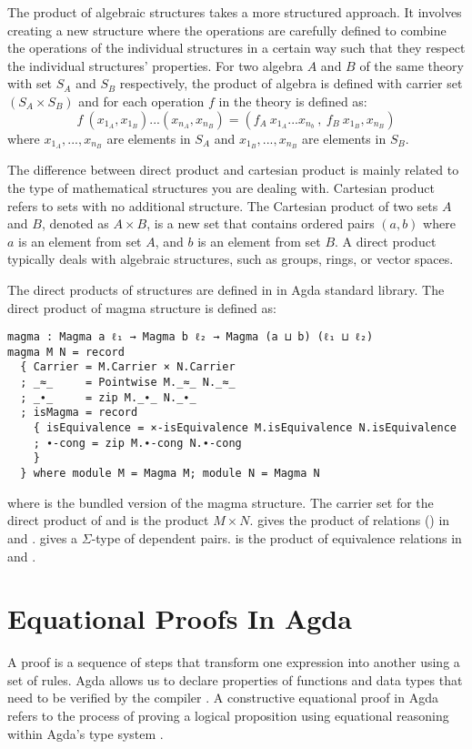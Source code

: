 The product of algebraic structures takes a more structured approach. It
involves creating a new structure where the operations are carefully defined to
combine the operations of the individual structures in a certain way such that
they respect the individual structures' properties. For two algebra $A$ and $B$
of the same theory with set $S_A$ and $S_B$ respectively, the product of algebra
is defined with carrier set $(S_A \times S_B)$ and for each operation $f$ in the
theory is defined as:
\[f\ (x_{1_A},x_{1_B})...(x_{n_A},x_{n_B}) = (f_A\ x_{1_A}...x_{n_b}\ ,\ f_B\
x_{1_B},x_{n_B} )\] where $x_{1_A},...,x_{n_B}$ are elements in $S_A$ and
$x_{1_B},...,x_{n_B}$ are elements in $S_B$. 

The difference between direct product and cartesian product is mainly related
to the type of mathematical structures you are dealing with. Cartesian product
refers to sets with no additional structure. The Cartesian product of two sets $A$
and $B$, denoted as $A × B$, is a new set that contains ordered pairs $(a, b)$ where
$a$ is an element from set $A$, and $b$ is an element from set $B$. A direct product
typically deals with algebraic structures, such as groups, rings, or vector
spaces.

The direct products of structures are defined in
 in Agda standard library. The direct
product of magma structure is defined as:

\begin{verbatim}
magma : Magma a ℓ₁ → Magma b ℓ₂ → Magma (a ⊔ b) (ℓ₁ ⊔ ℓ₂)
magma M N = record
  { Carrier = M.Carrier × N.Carrier
  ; _≈_     = Pointwise M._≈_ N._≈_
  ; _∙_     = zip M._∙_ N._∙_
  ; isMagma = record
    { isEquivalence = ×-isEquivalence M.isEquivalence N.isEquivalence
    ; ∙-cong = zip M.∙-cong N.∙-cong
    }
  } where module M = Magma M; module N = Magma N
\end{verbatim}

where  is the bundled version of the magma structure. The carrier
set for the direct product of  and  is the product $M \times N$.
\inline{Pointwise} gives the product of relations (\inline{_≈_}) in 
and \inline{N}. \inline{zip} gives a $\Sigma$-type of dependent pairs.
\inline{×-isEquivalence} is the product of equivalence relations in \inline{M}
and \inline{N}.

\section{Equational Proofs In Agda}
A proof is a sequence of steps that transform one expression into another using
a set of rules. Agda allows us to declare properties of functions and data types
that need to be verified by the compiler \cite{kidney2020finiteness}. A
constructive equational proof in Agda refers to the process of proving a logical
proposition using equational reasoning within Agda's type system
\cite{murray2022constructive}. 

